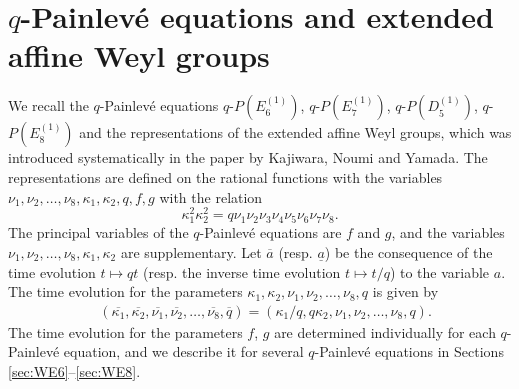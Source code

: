 \documentclass[12pt]{amsart}
\numberwithin{equation}{section}
\theoremstyle{definition}
\begin{document}
\section{$q$-Painlev\'e equations and extended affine Weyl groups} \label{sec:prel}
We recall the $q$-Painlev\'e equations $q$-$P(E^{(1)}_6)$, $q$-$P(E^{(1)}_7)$, $q$-$P(D^{(1)}_5)$, $q$-$P(E^{(1)}_8)$ and the representations of the extended affine Weyl groups, which was introduced systematically in the paper \cite{KNY} by Kajiwara, Noumi and Yamada.
The representations are defined on the rational functions with the variables $\nu_{1}, \nu_{2}, \dots , \nu_{8} , \kappa _1 , \kappa _2, q, f,g $ with the relation
\begin{equation}
\kappa _1 ^2 \kappa _2^2 = q \nu_{1}\nu_{2}\nu_{3}\nu_{4} \nu_{5}\nu_{6}\nu_{7}\nu_{8} .
\end{equation}  
The principal variables of the $q$-Painlev\'e equations are $f$ and $g$, and the variables $\nu_{1}, \nu_{2}, \dots , \nu_{8} , \kappa _1 , \kappa _2$ are supplementary.
Let $\overline{a} $ (resp. $\underline{a}$) be the consequence of the time evolution $t \mapsto qt$ (resp. the inverse time evolution $t \mapsto t/q$) to the variable $a$.
The time evolution for the parameters $\kappa _1 , \kappa _2 , \nu_{1}, \nu_{2}, \dots , \nu_{8} ,  q$ is given by 
\begin{align}
& ( \overline{\kappa _1} , \overline{\kappa _2} , \overline{\nu_{1}} , \overline{\nu_{2}} , \dots , \overline{\nu_{8}} ,  \overline{q} ) =  ( \kappa _1 /q , q \kappa _2 , \nu_{1}, \nu_{2}, \dots , \nu_{8} ,  q )  . 
\label{eq:Tolinenu}
\end{align}
The time evolution for the parameters $f$, $g$ are determined individually for each $q$-Painlev\'e equation, and we describe it for several $q$-Painlev\'e equations in Sections \ref{sec:WE6}--\ref{sec:WE8}.
\end{document}
